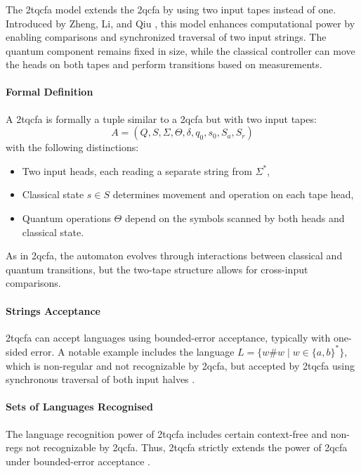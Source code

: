 \subsubsection{}

  
The \gls{2tqcfa} model extends the \gls{2qcfa} by using two input tapes instead of one. Introduced by Zheng, Li, and Qiu \cite{zheng2011two}, this model enhances computational power by enabling comparisons and synchronized traversal of two input strings. The quantum component remains fixed in size, while the classical controller can move the heads on both tapes and perform transitions based on measurements.

\paragraph{Formal Definition}  
A \gls{2tqcfa} is formally a tuple similar to a \gls{2qcfa} but with two input tapes:
\[
A = (Q, S, \Sigma, \Theta, \delta, q_0, s_0, S_a, S_r)
\]
with the following distinctions:
\begin{itemize}
    \item Two input heads, each reading a separate string from $\Sigma^*$,
    \item Classical state $s \in S$ determines movement and operation on each tape head,
    \item Quantum operations $\Theta$ depend on the symbols scanned by both heads and classical state.
\end{itemize}
As in \gls{2qcfa}, the automaton evolves through interactions between classical and quantum transitions, but the two-tape structure allows for cross-input comparisons.

\paragraph{Strings Acceptance}  
\gls{2tqcfa} can accept languages using bounded-error acceptance, typically with one-sided error. A notable example includes the language $L = \{ w \# w \mid w \in \{a, b\}^* \}$, which is non-regular and not recognizable by \gls{2qcfa}, but accepted by \gls{2tqcfa} using synchronous traversal of both input halves \cite{zheng2011two}.

\paragraph{Sets of Languages Recognised}  
The language recognition power of \gls{2tqcfa} includes certain context-free and non-\glspl{reg} not recognizable by \gls{2qcfa}. Thus, \gls{2tqcfa} strictly extends the power of \gls{2qcfa} under bounded-error acceptance \cite{zheng2011two}.

